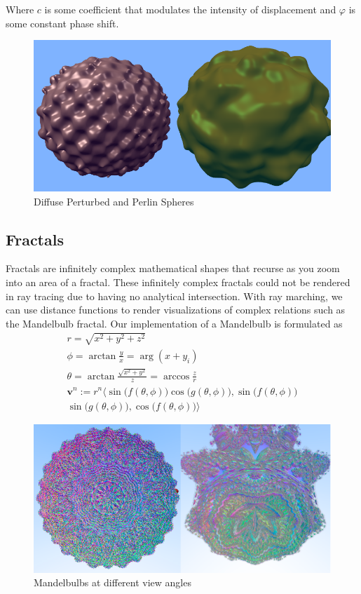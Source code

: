 \documentclass[sigconf, nonacm]{acmart}
\begin{document}
Where $c$ is some coefficient that modulates the intensity of displacement and $\varphi$ is some constant phase shift.

\begin{figure}[h]
  \centering
  \includegraphics[width=.75\linewidth]{images/perturbed-spheres.png}
  \caption{Diffuse Perturbed and Perlin Spheres}
\end{figure}

\subsection{Fractals}

Fractals are infinitely complex mathematical shapes that recurse as you zoom into an area of a fractal. These infinitely complex fractals could not be rendered in ray tracing due to having no analytical intersection. With ray marching, we can use distance functions to render visualizations of complex relations such as the Mandelbulb fractal. Our implementation of a Mandelbulb is formulated as
\begin{gather*}
r={\sqrt {x^{2}+y^{2}+z^{2}}}\\
\phi=\arctan{\frac{y}{x}}=\arg(x+y_i)\\
\theta=\arctan{\frac{\sqrt{x^{2}+y^{2}}}{z}}=\arccos{\frac{z}{r}}\\
\mathbf{v} ^{n}:=r^{n}{\big \langle }\sin {\big (}f(\theta ,\phi ){\big )}\cos {\big (}g(\theta ,\phi ){\big )},\sin {\big (}f(\theta ,\phi ){\big )}\\
\sin {\big (}g(\theta ,\phi ){\big )},\cos {\big (}f(\theta ,\phi ){\big )}{\big \rangle }
\end{gather*}

\begin{figure}[h]
  \centering
  \includegraphics[width=0.75\linewidth]{images/fractals.png}
  \caption{Mandelbulbs at different view angles}
\end{figure}
\end{document}
